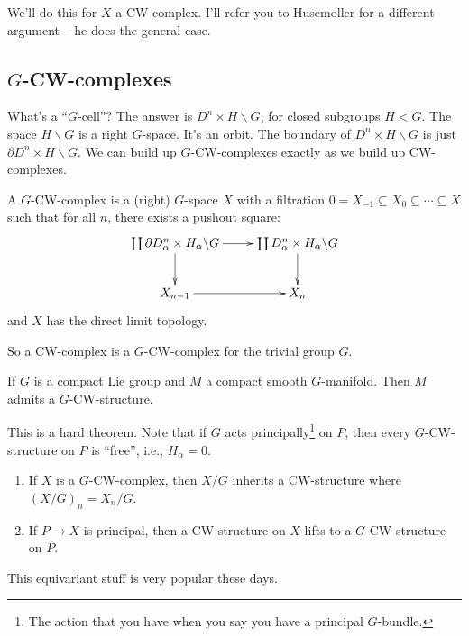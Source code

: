 We'll do this for $X$ a CW-complex. I'll refer you to Husemoller for a different argument -- he does the general case.
\subsection{$G$-CW-complexes}
What's a ``$G$-cell''? The answer is $D^n\times H\backslash G$, for closed subgroups $H<G$. The space $H\backslash G$ is a right $G$-space. It's an orbit.
The boundary of $D^n\times H\backslash G$ is just $\partial D^n\times H\backslash G$. We can build up $G$-CW-complexes exactly as we build up CW-complexes.
\begin{definition}
    A $G$-CW-complex is a (right) $G$-space $X$ with a filtration $0=X_{-1}\subseteq X_0\subseteq \cdots\subseteq X$ such that for all $n$, there exists a pushout square:
    \begin{equation*}
	\xymatrix{
	    \coprod\partial D^n_\alpha\times H_\alpha\backslash G\ar[r]\ar[d] & \coprod D^n_\alpha\times H_\alpha\backslash G\ar[d]\\
	    X_{n-1}\ar[r] & X_n
	    }
    \end{equation*}
    and $X$ has the direct limit topology.
\end{definition}
So a CW-complex is a $G$-CW-complex for the trivial group $G$.
\begin{theorem}
    If $G$ is a compact Lie group and $M$ a compact smooth $G$-manifold. Then $M$ admits a $G$-CW-structure.
\end{theorem}
This is a hard theorem.
Note that if $G$ acts principally\footnote{The action that you have when you say you have a principal $G$-bundle.} on $P$, then every $G$-CW-structure on $P$ is ``free'', i.e., $H_\alpha = 0$.
\begin{enumerate}
    \item If $X$ is a $G$-CW-complex, then $X/G$ inherits a CW-structure where $(X/G)_n = X_n/G$.
    \item If $P\to X$ is principal, then a CW-structure on $X$ lifts to a $G$-CW-structure on $P$.
\end{enumerate}
This equivariant stuff is very popular these days.
